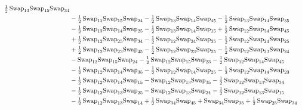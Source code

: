 \documentclass[12pt,dvipsnames,accepted=2016-08-18,a4paper,onecolumn]{quantumarticle}
\numberwithin{equation}{section}
\theoremstyle{definition}
\begin{document}
\begin{align*}
        \tfrac12\,\textnormal{Swap}_{13} \textnormal{Swap}_{15} \textnormal{Swap}_{34}\\ & - \tfrac12\,\textnormal{Swap}_{13} \textnormal{Swap}_{15} \textnormal{Swap}_{24}  - \tfrac12\,\textnormal{Swap}_{13} \textnormal{Swap}_{14} \textnormal{Swap}_{45} - \tfrac12\,\textnormal{Swap}_{13} \textnormal{Swap}_{14} \textnormal{Swap}_{35}\\ & -
        \tfrac12\,\textnormal{Swap}_{13} \textnormal{Swap}_{14} \textnormal{Swap}_{25}  - \tfrac12\,\textnormal{Swap}_{13} \textnormal{Swap}_{14} \textnormal{Swap}_{15} + \tfrac12\,\textnormal{Swap}_{12} \textnormal{Swap}_{34} \textnormal{Swap}_{45} \\ & + \tfrac12\,\textnormal{Swap}_{12} \textnormal{Swap}_{25} \textnormal{Swap}_{34} -
        \tfrac12\,\textnormal{Swap}_{12} \textnormal{Swap}_{24} \textnormal{Swap}_{35} - \tfrac12\,\textnormal{Swap}_{12} \textnormal{Swap}_{24} \textnormal{Swap}_{25}\\ & + \tfrac12\,\textnormal{Swap}_{12} \textnormal{Swap}_{23} \textnormal{Swap}_{45} - \tfrac12\,\textnormal{Swap}_{12} \textnormal{Swap}_{23} \textnormal{Swap}_{25} -
        \tfrac12\,\textnormal{Swap}_{12} \textnormal{Swap}_{23} \textnormal{Swap}_{24}\\ & - \textnormal{Swap}_{12} \textnormal{Swap}_{15} \textnormal{Swap}_{24} - \tfrac12\,\textnormal{Swap}_{12} \textnormal{Swap}_{15} \textnormal{Swap}_{23} - \tfrac12\,\textnormal{Swap}_{12} \textnormal{Swap}_{14} \textnormal{Swap}_{45}\\ & -
        \tfrac12\,\textnormal{Swap}_{12} \textnormal{Swap}_{14} \textnormal{Swap}_{35} - \tfrac12\,\textnormal{Swap}_{12} \textnormal{Swap}_{14} \textnormal{Swap}_{25} - \tfrac12\,\textnormal{Swap}_{12} \textnormal{Swap}_{14} \textnormal{Swap}_{23}\\ & - \tfrac12\,\textnormal{Swap}_{12} \textnormal{Swap}_{14} \textnormal{Swap}_{15}-
        \textnormal{Swap}_{12} \textnormal{Swap}_{13} \textnormal{Swap}_{35} - \tfrac12\,\textnormal{Swap}_{12} \textnormal{Swap}_{13} \textnormal{Swap}_{34} \\ & - \tfrac12\,\textnormal{Swap}_{12} \textnormal{Swap}_{13} \textnormal{Swap}_{25} - \textnormal{Swap}_{12} \textnormal{Swap}_{13} \textnormal{Swap}_{24} -
        \tfrac12\,\textnormal{Swap}_{12} \textnormal{Swap}_{13} \textnormal{Swap}_{15}\\ & - \tfrac12\,\textnormal{Swap}_{12} \textnormal{Swap}_{13} \textnormal{Swap}_{14} + \tfrac12\,\textnormal{Swap}_{34} \textnormal{Swap}_{45} + \textnormal{Swap}_{34} \textnormal{Swap}_{35} + \tfrac12\,\textnormal{Swap}_{25} \textnormal{Swap}_{34}\\ &

\end{align*}
\end{document}
